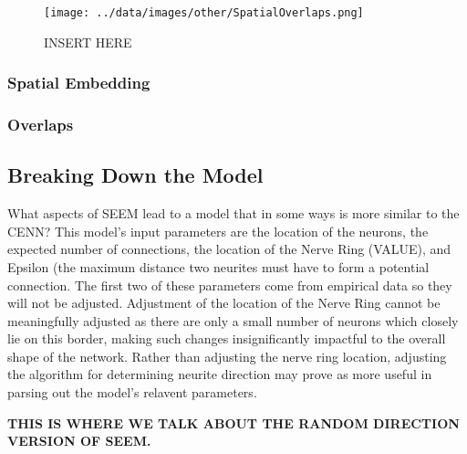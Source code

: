 
\begin{figure}[h]
  \texttt{[image: ../data/images/other/SpatialOverlaps.png]}
  \caption{INSERT HERE}
\end{figure}

\subsubsection{Spatial Embedding}
\subsubsection{Overlaps}

\subsection{Breaking Down the Model}
What aspects of SEEM lead to a model that in some ways is more similar to the CENN? This model's input parameters are the location of the neurons, the expected number of connections, the location of the Nerve Ring (VALUE), and Epsilon (the maximum distance two neurites must have to form a potential connection. The first two of these parameters come from empirical data so they will not be adjusted. Adjustment of the location of the Nerve Ring cannot be meaningfully adjusted as there are only a small number of neurons which closely lie on this border, making such changes insignificantly impactful to the overall shape of the network. Rather than adjusting the nerve ring location, adjusting the algorithm for determining neurite direction may prove as more useful in parsing out the model's relavent parameters. 

\textbf{THIS IS WHERE WE TALK ABOUT THE RANDOM DIRECTION VERSION OF SEEM.}




